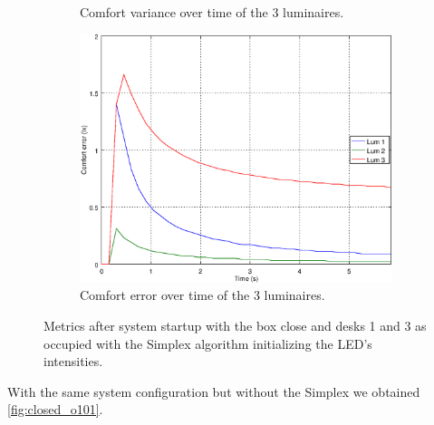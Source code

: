 \begin{figure}[ht]
\begin{subfigure}[t]{0.32\textwidth}
    \caption{Comfort variance over time of the 3 luminaires.}
    \label{fig:f_}
    \end{subfigure}
    \begin{subfigure}[t]{0.32\textwidth}
    \centering
    \includegraphics[width=.95\textwidth]{img/n_}
    \caption{Comfort error over time of the 3 luminaires.}
    \label{fig:n_}
    \end{subfigure}
    \caption{Metrics after system startup with the box close and desks 1 and 3 as occupied with the Simplex algorithm initializing the LED's intensities.}
    \label{fig:res_simplex}
\end{figure}

With the same system configuration but without the Simplex we obtained \autoref{fig:closed_o101}.

